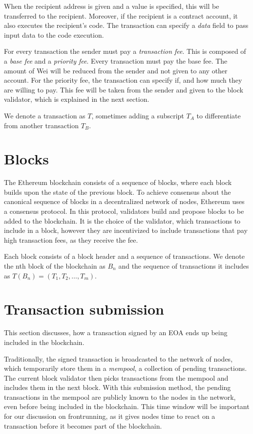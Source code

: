 \documentclass[draft,final]{vutinfth} %
\begin{document}
When the recipient address is given and a value is specified, this will be transferred to the recipient. Moreover, if the recipient is a contract account, it also executes the recipient's code. The transaction can specify a \emph{data} field to pass input data to the code execution. \cite[p.4-5]{wood_ethereum_2024}

For every transaction the sender must pay a \emph{transaction fee}. This is composed of a \emph{base fee} and a \emph{priority fee}. Every transaction must pay the base fee. The amount of Wei will be reduced from the sender and not given to any other account. For the priority fee, the transaction can specify if, and how much they are willing to pay. This fee will be taken from the sender and given to the block validator, which is explained in the next section. \cite[p.8]{wood_ethereum_2024}

We denote a transaction as $T$, sometimes adding a subscript $T_A$ to differentiate from another transaction $T_B$.

\section{Blocks}

The Ethereum blockchain consists of a sequence of blocks, where each block builds upon the state of the previous block. To achieve consensus about the canonical sequence of blocks in a decentralized network of nodes, Ethereum uses a consensus protocol. In this protocol, validators build and propose blocks to be added to the blockchain. \cite{noauthor_gasper_2023} It is the choice of the validator, which transactions to include in a block, however they are incentivized to include transactions that pay high transaction fees, as they receive the fee. \cite[p.8]{wood_ethereum_2024}

Each block consists of a block header and a sequence of transactions. We denote the nth block of the blockchain as $B_n$ and the sequence of transactions it includes as $T(B_n) = (T_1, T_2, \dots, T_m)$.

\section{Transaction submission}

This section discusses, how a transaction signed by an EOA ends up being included in the blockchain.

Traditionally, the signed transaction is broadcasted to the network of nodes, which temporarily store them in a \emph{mempool}, a collection of pending transactions. The current block validator then picks transactions from the mempool and includes them in the next block. With this submission method, the pending transactions in the mempool are publicly known to the nodes in the network, even before being included in the blockchain. This time window will be important for our discussion on frontrunning, as it gives nodes time to react on a transaction before it becomes part of the blockchain. \cite{eskandari_sok_2020}
\end{document}
